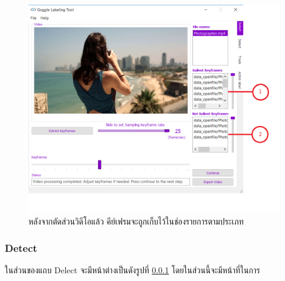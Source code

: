 \begin{figure}[!ht]
    \centering
    \includegraphics[width=1\textwidth]{chapter3/images/3_3/SelectTab_sampled.png}
    \caption{หลังจากตัดส่วนวิดีโอแล้ว คีย์เฟรมจะถูกเก็บไว้ในช่องรายการตามประเภท}
    \label{fig:SelectTab_sampled}
\end{figure}
\clearpage
\subsubsection{Detect}
ในส่วนของแถบ Delect จะมีหน้าต่างเป็นดังรูปที่ \ref{} โดยในส่วนนี้จะมีหน้าที่ในการ

